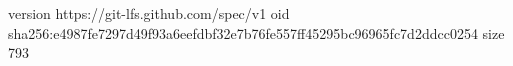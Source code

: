 version https://git-lfs.github.com/spec/v1
oid sha256:e4987fe7297d49f93a6eefdbf32e7b76fe557ff45295bc96965fc7d2ddcc0254
size 793
